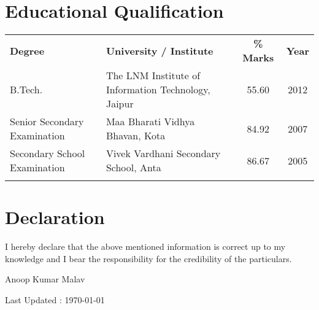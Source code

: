 \documentclass[10pt]{article}
\begin{document}
\section*{Educational Qualification}
\begin{tabular}{l l c c}
\textbf{Degree} & \textbf{University / Institute} & \textbf{\% Marks} & \textbf{Year}\\[0.2cm]
B.Tech. & The LNM Institute of Information Technology, Jaipur  & 55.60 & 2012\\[0.2cm]
Senior Secondary Examination & Maa Bharati Vidhya Bhavan, Kota & 84.92 & 2007\\[0.2cm]
Secondary School Examination & Vivek Vardhani Secondary School, Anta  & 86.67 & 2005\\
 & & & \\
\end{tabular}

\section*{Declaration}
I hereby declare that the above mentioned information is correct up to
my knowledge and I bear the responsibility for the credibility of the particulars.\\
\begin{flushright}
 Anoop Kumar Malav
\end{flushright}
\begin{center}
 
Last Updated : \today 

\end{center}
\end{document}
